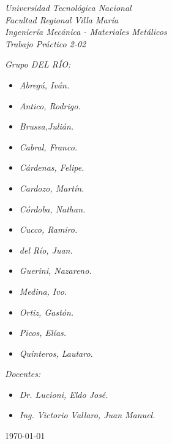 \begin{titlepage}
	
	\begin{center}
		{\huge \textit{Universidad Tecnológica Nacional}}\\
        \vspace{0.5cm}
		{\LARGE \textit{Facultad Regional Villa María}}\\
		\vspace{1.5cm}
        {\LARGE{\textit{Ingeniería Mecánica - Materiales Metálicos}}}\\
		\vspace{1.5cm}
        \LARGE{\textit{Trabajo Práctico 2-02}}
	\end{center}
	
	\vfill

    \textit{Grupo DEL RÍO:}
	\begin{itemize}
		\item \textit{Abregú, Iván.}
		\item \textit{Antico, Rodrigo.}
		\item \textit{Brussa,Julián.}
		\item \textit{Cabral, Franco.}
        \item \textit{Cárdenas, Felipe.}
        \item \textit{Cardozo, Martín.}
        \item \textit{Córdoba, Nathan.}
        \item \textit{Cucco, Ramiro.}
        \item \textit{del Río, Juan.}
        \item \textit{Guerini, Nazareno.}
        \item \textit{Medina, Ivo.}
        \item \textit{Ortiz, Gastón.}
        \item \textit{Picos, Elías.}
        \item \textit{Quinteros, Lautaro.}
	\end{itemize}
    
	\textit{Docentes:}
	\begin{itemize}
		\item \textit{Dr. Lucioni, Eldo José.}
		\item \textit{Ing. Victorio Vallaro, Juan Manuel.}
	\end{itemize}
	\centering
	\today
	
\end{titlepage}
